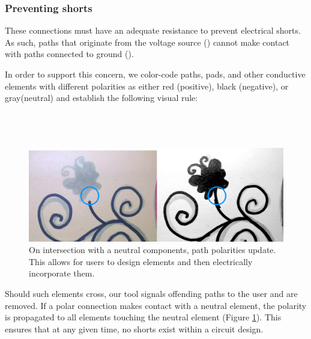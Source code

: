 \documentclass{sigchi}
\begin{document}
    \subsubsection{Preventing shorts}
    These connections must have an adequate resistance to prevent electrical shorts. As such, paths that originate from the voltage source () cannot make contact with paths connected to ground ().

    In order to support this concern, we color-code paths, pads, and other conductive elements with different polarities as either red (positive), black (negative), or gray(neutral) and establish the following visual rule:
    \\
    \\
    \noindent{}
    \\
    \\
\begin{figure}[h]
\centering
\includegraphics[width=1.0\columnwidth]{figures/propagation.pdf}
\caption{On intersection with a neutral components, path polarities update. This allows for users to design elements and then electrically incorporate them. }
\label{fig:propagation}
\end{figure}
    Should such elements cross, our tool signals offending paths to the user and are removed. If a polar connection makes contact with a neutral element, the polarity is propagated to all elements touching the neutral element (Figure \ref{fig:propagation}). This ensures that at any given time, no shorts exist within a circuit design.

\end{document}

